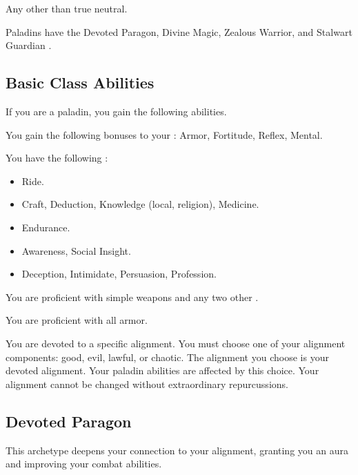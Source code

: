      Any other than true neutral.

     Paladins have the Devoted Paragon, Divine Magic, Zealous Warrior, and Stalwart Guardian .

    \subsection{Basic Class Abilities}
        If you are a paladin, you gain the following abilities.

        You gain the following bonuses to your :  Armor,  Fortitude,  Reflex,  Mental.

        You have the following :
        \begin{itemize}
            \item {} Ride.
            \item {} Craft, Deduction, Knowledge (local, religion), Medicine.
            \item {} Endurance.
            \item {} Awareness, Social Insight.
            \item {} Deception, Intimidate, Persuasion, Profession.
        \end{itemize}

        You are proficient with simple weapons and any two other .

        You are proficient with all armor.

        You are devoted to a specific alignment.
        You must choose one of your alignment components: good, evil, lawful, or chaotic.
        The alignment you choose is your devoted alignment.
        Your paladin abilities are affected by this choice.
        Your alignment cannot be changed without extraordinary repurcussions.

    \newpage
    \subsection{Devoted Paragon}
        This archetype deepens your connection to your alignment, granting you an aura and improving your combat abilities.

